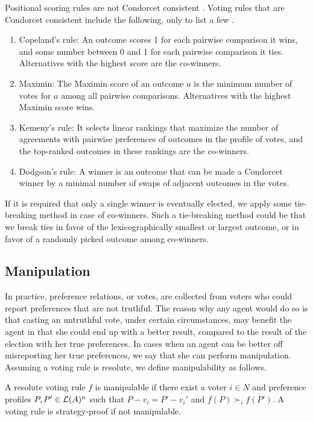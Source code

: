 Positional scoring rules are not Condorcet consistent \cite{Fis}.
Voting rules that are Condorcet consistent include the following,
only to list a few \cite{Brandt:COMSOC}.
\begin{enumerate} \itemsep -4pt
	\item Copeland's rule: An outcome scores 1 for each pairwise comparison
				it wins, and some number between 0 and 1 for each pairwise comparison
				it ties.  Alternatives with the highest score are the co-winners.
	\item Maximin: The Maximin score of an outcome $a$ is the minimum number of
				votes for $a$ among all pairwise comparisons.  
				Alternatives with the highest Maximin score wins.
	\item Kemeny's rule: It selects linear rankings that maximize the number of agreements 
				with pairwise preferences of outcomes in the profile of votes, and
				the top-ranked outcomes in these rankings are the co-winners.
	\item Dodgson's rule: A winner is an outcome that can be made a Condorcet winner 
				by a minimal number of swaps of adjacent outcomes in the votes.
\end{enumerate}

If it is required that only a single winner is eventually elected,
we apply some tie-breaking method in case of co-winners.
Such a tie-breaking method could be that we break ties in favor of
the lexicographically smallest or largest outcome, or in favor of
a randomly picked outcome among co-winners.







\subsection{Manipulation \label{sec:manip}}
In practice, preference relations, or votes, are collected from voters
who could report preferences that are not truthful.
The reason why any agent would do so is that
casting an untruthful vote, under certain circumstances,
may benefit the agent in that she could end up with
a better result, compared to the result of the election
with her true preferences.
In cases when an agent can be better off misreporting her
true preferences, we say that she can perform manipulation.
Assuming a voting rule is resolute,
we define manipulability as follows.

\begin{definition}
	A resolute voting rule $f$ is manipulable if there exist
	a voter $i \in N$ and preference profiles $P,P' \in \mathcal{L}(A)^n$
	such that $P-v_i=P'-v_i'$ and $f(P) \succ_i f(P')$.
	A voting rule is strategy-proof if not manipulable.
\end{definition}

